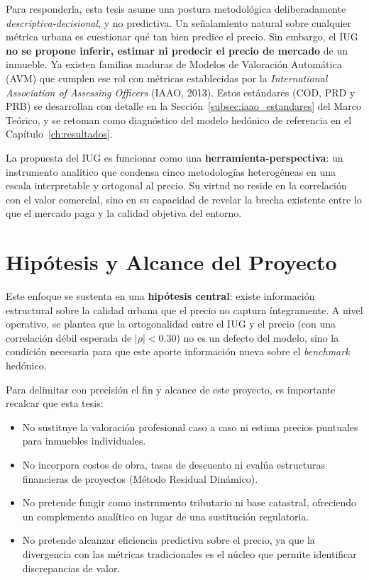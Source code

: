 \documentclass[12pt, a4paper, twoside, openright]{report}
\theoremstyle{plain}
\theoremstyle{definition}
\newcommand{\IUG}{IUG}             %
\begin{document}
Para responderla, esta tesis asume una postura metodológica deliberadamente \emph{descriptiva-decisional}, y no predictiva. Un señalamiento natural sobre cualquier métrica urbana es cuestionar qué tan bien predice el precio. Sin embargo, el \IUG{} \textbf{no se propone inferir, estimar ni predecir el precio de mercado} de un inmueble. Ya existen familias maduras de Modelos de Valoración Automática (AVM) que cumplen ese rol con métricas establecidas por la \textit{International Association of Assessing Officers} (IAAO, 2013). Estos estándares (COD, PRD y PRB) se desarrollan con detalle en la Sección~\ref{subsec:iaao_estandares} del Marco Teórico, y se retoman como diagnóstico del modelo hedónico de referencia en el Capítulo~\ref{ch:resultados}. 

La propuesta del \IUG{} es funcionar como una \textbf{herramienta-perspectiva}: un instrumento analítico que condensa cinco metodologías heterogéneas en una escala interpretable y ortogonal al precio. Su virtud no reside en la correlación con el valor comercial, sino en su capacidad de revelar la brecha existente entre lo que el mercado paga y la calidad objetiva del entorno.

\section{Hipótesis y Alcance del Proyecto}

Este enfoque se sustenta en una \textbf{hipótesis central}: existe información estructural sobre la calidad urbana que el precio no captura íntegramente. A nivel operativo, se plantea que la ortogonalidad entre el \IUG{} y el precio (con una correlación débil esperada de $|\rho| < 0.30$) no es un defecto del modelo, sino la condición necesaria para que este aporte información nueva sobre el \emph{benchmark} hedónico.

Para delimitar con precisión el fin y alcance de este proyecto, es importante recalcar que esta tesis:

\begin{itemize}
    \item No sustituye la valoración profesional caso a caso ni estima precios puntuales para inmuebles individuales.
    \item No incorpora costos de obra, tasas de descuento ni evalúa estructuras financieras de proyectos (Método Residual Dinámico).
    \item No pretende fungir como instrumento tributario ni base catastral, ofreciendo un complemento analítico en lugar de una sustitución regulatoria.
    \item No pretende alcanzar eficiencia predictiva sobre el precio, ya que la divergencia con las métricas tradicionales es el núcleo que permite identificar discrepancias de valor.
\end{itemize}
\end{document}
